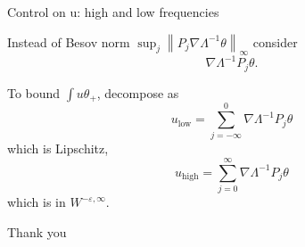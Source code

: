 \documentclass{beamer}
\newcommand{\eps}{\varepsilon}
\newcommand{\norm}[1]{\left\lVert#1\right\rVert}
\newcommand{\grad}{\nabla}
\newcommand{\n}{^{-1}}
\begin{document}

\begin{frame}{Control on u: high and low frequencies}

Instead of Besov norm $\sup_j \norm{P_j \grad \Lambda\n \theta}_\infty$ consider
\[ \grad \Lambda\n P_j \theta. \]

To bound $\int u \theta_+$, decompose as
\[ u_{\textrm{low}} = \sum_{j=-\infty}^0 \grad \Lambda\n P_j \theta \]
which is Lipschitz,
\[ u_{\textrm{high}} = \sum_{j=0}^\infty \grad \Lambda\n P_j \theta \]
which is in $W^{-\eps, \infty}$.  

\end{frame}




\begin{frame}
\centering \Large
Thank you

\end{frame}
\end{document}
